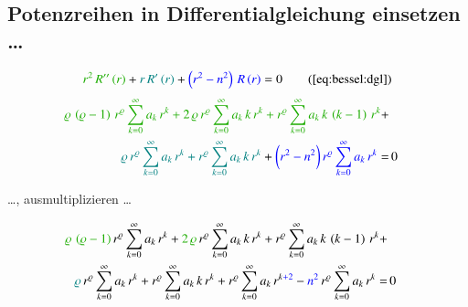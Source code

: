 \subsection[Potenzreihen in Differentialgleichung \refeq{eq:bessel:dgl} einsetzen]{Potenzreihen in Differentialgleichung  einsetzen \dots}
%

\begin{align*}
	\textcolor{mygreen}{r^2 \, R'' \left( r \right)}
	+
	\textcolor{teal}{r \, R' \left( r \right)}
	+
	\textcolor{blue}{\left( r^2 - n^2 \right) \, R \left( r \right)}
	=
	0
	\tag{\ref{eq:bessel:dgl}}
\end{align*}
%
\begin{align*}	
	\textcolor{mygreen}{
		\varrho \, \left( \varrho - 1 \right) \, r^{\varrho}
		\sum_{k=0}^{\infty} a_k \, r^k
		+
		2 \, \varrho \, r^{\varrho}
		\sum_{k=0}^{\infty} a_k \, k \, r^k
		+
		r^{\varrho}
		\sum_{k=0}^{\infty} a_k \, k \, \left( k - 1 \right) \, r^k
	}
	+ \\
	\textcolor{teal}{
		\varrho \, r^{\varrho}
		\sum_{k=0}^{\infty} a_k \, r^k
		+
		r^{\varrho}
		\sum_{k=0}^{\infty} a_k \, k \, r^k
	}
	+ 
	\textcolor{blue}{
		\biggl(
		r^2 - n^2
		\biggr) \,
		r^{\varrho}
		\sum_{k=0}^{\infty} a_k \, r^k
	}
	= & \, 0
\end{align*}
\begin{normalsize}
	\dots , ausmultiplizieren \dots
\end{normalsize}
\begin{align*}
	\textcolor{mygreen}{	\varrho \, \left( \varrho - 1 \right)} 
	\, r^{\varrho}
	\sum_{k=0}^{\infty} a_k \, r^k
	+
	\textcolor{mygreen}{2 \, \varrho}
	\, r^{\varrho}
	\sum_{k=0}^{\infty} a_k \, k \, r^k
	+
	r^{\varrho}
	\sum_{k=0}^{\infty} a_k \, k \, \left( k - 1 \right) \, r^k
	+ \\
	\textcolor{teal}{\varrho}
	\, r^{\varrho}
	\sum_{k=0}^{\infty} a_k \, r^k
	+
	r^{\varrho}
	\sum_{k=0}^{\infty} a_k \, k \, r^k
	+
	r^{\varrho}
		\sum_{k=0}^{\infty} a_k \, r^{k \textcolor{blue}{+ 2}}
	-
	\textcolor{blue}{n^2}
	\, r^{\varrho}
	\sum_{k=0}^{\infty} a_k \, r^k
	= & \, 0
\end{align*}
\\
